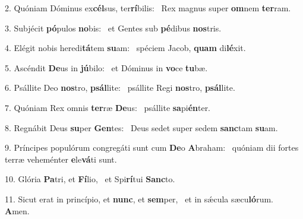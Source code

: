2. Quóniam Dóminus ex\textbf{cél}sus, ter\textbf{rí}bilis: \ast\  Rex magnus super \textbf{om}nem \textbf{ter}ram.\

3. Subjécit \textbf{pó}pulos \textbf{no}bis: \ast\  et Gentes sub \textbf{pé}dibus \textbf{nos}tris.\

4. Elégit nobis heredi\textbf{tá}tem \textbf{su}am: \ast\  spéciem Jacob, \textbf{quam} di\textbf{lé}xit.\

5. Ascéndit \textbf{De}us in \textbf{jú}bilo: \ast\  et Dóminus in \textbf{vo}ce \textbf{tu}bæ.\

6. Psállite Deo \textbf{nos}tro, \textbf{psál}lite: \ast\  psállite Regi \textbf{nos}tro, \textbf{psál}lite.\

7. Quóniam Rex omnis \textbf{ter}ræ \textbf{De}us: \ast\  psállite \textbf{sa}pi\textbf{én}ter.\

8. Regnábit Deus \textbf{su}per \textbf{Gen}tes: \ast\  Deus sedet super sedem \textbf{sanc}tam \textbf{su}am.\

9. Príncipes populórum congregáti sunt cum \textbf{De}o \textbf{A}braham: \ast\  quóniam dii fortes terræ veheménter \textbf{e}le\textbf{vá}ti sunt.\

10. Glória \textbf{Pa}tri, et \textbf{Fí}lio, \ast\  et Spi\textbf{rí}tui \textbf{Sanc}to.\

11. Sicut erat in princípio, et \textbf{nunc}, et \textbf{sem}per, \ast\  et in sǽcula sæcu\textbf{ló}rum. \textbf{A}men.\

